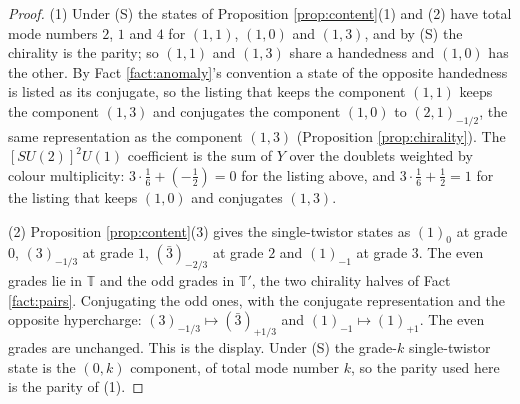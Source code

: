 \documentclass[11pt]{article}
\theoremstyle{definition}
\newcommand{\T}{\mathbb{T}}
\begin{document}
\begin{proof}
(1) Under (S) the states of Proposition \ref{prop:content}(1) and (2) have total mode numbers $2$, $1$ and $4$ for $(1,1)$, $(1,0)$ and $(1,3)$, and by (S) the chirality is the parity; so $(1,1)$ and $(1,3)$ share a handedness and $(1,0)$ has the other. By Fact \ref{fact:anomaly}'s convention a state of the opposite handedness is listed as its conjugate, so the listing that keeps the component $(1,1)$ keeps the component $(1,3)$ and conjugates the component $(1,0)$ to $(2,1)_{-1/2}$, the same representation as the component $(1,3)$ (Proposition \ref{prop:chirality}). The $[SU(2)]^{2}U(1)$ coefficient is the sum of $Y$ over the doublets weighted by colour multiplicity: $3 \cdot \tfrac16 + (-\tfrac12) = 0$ for the listing above, and $3 \cdot \tfrac16 + \tfrac12 = 1$ for the listing that keeps $(1,0)$ and conjugates $(1,3)$.

(2) Proposition \ref{prop:content}(3) gives the single-twistor states as $(1)_{0}$ at grade $0$, $(3)_{-1/3}$ at grade $1$, $(\bar{3})_{-2/3}$ at grade $2$ and $(1)_{-1}$ at grade $3$. The even grades lie in $\T$ and the odd grades in $\T'$, the two chirality halves of Fact \ref{fact:pairs}. Conjugating the odd ones, with the conjugate representation and the opposite hypercharge: $(3)_{-1/3} \mapsto (\bar{3})_{+1/3}$ and $(1)_{-1} \mapsto (1)_{+1}$. The even grades are unchanged. This is the display. Under (S) the grade-$k$ single-twistor state is the $(0, k)$ component, of total mode number $k$, so the parity used here is the parity of (1).


\end{proof}
\end{document}
